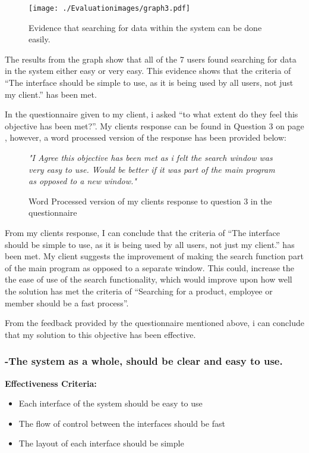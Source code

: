 \begin{figure}[H]
\caption{Evidence that searching for data within the system can be done easily.} \label{graph3}
\hfill\texttt{[image: ./Evaluationimages/graph3.pdf]}
\end{figure}

The results from the graph show that all of the 7 users found searching for data in the system either easy or very easy. This evidence shows that the criteria of ``The interface should be simple to use, as it is being used by all users, not just my client.'' has been met.

In the questionnaire given to my client, i asked ``to what extent do they feel this objective has been met?''. My clients response can be found in Question 3 on page \pageref{Client-Q1}, however, a word processed version of the response has been provided below:

\begin{figure}[H]
\caption{Word Processed version of my clients response to question 3 in the questionnaire} \label{client-evidence-Q3}
\vspace{3mm}
\textit{\large{"I Agree this objective has been met as i felt the search window was very easy to use. Would be better if it was part of the main program as opposed to a new window."}}
\vspace{3mm}
\end{figure}

From my clients response, I can conclude that the criteria of ``The interface should be simple to use, as it is being used by all users, not just my client.'' has been met. My client suggests the improvement of making the search function part of the main program as opposed to a separate window. This could, increase the the ease of use of the search functionality, which would improve upon how well the solution has met the criteria of ``Searching for a product, employee or member should be a fast process''. 

From the feedback provided by the questionnaire mentioned above, i can conclude that my solution to this objective has been effective.






\pagebreak
\subsubsection{-The system as a whole, should be clear and easy to use.}

\textbf{Effectiveness Criteria:}\newline
\begin{itemize}
	\item{Each interface of the system should be easy to use}
	\item{The flow of control between the interfaces should be fast}
	\item{The layout of each interface should be simple}
\end{itemize}

